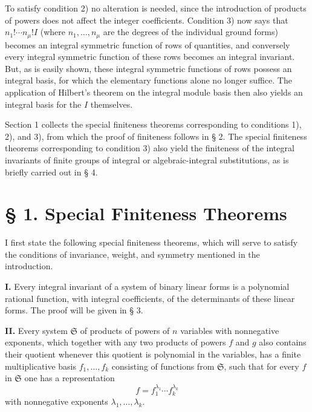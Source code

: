 \documentclass[11pt]{article}
\providecommand{\frS}{\mathfrak S}
\begin{document}
To satisfy condition 2) no alteration is needed, since the introduction of products of powers does not affect the integer coefficients. Condition 3) now says that \(n_1!\cdots n_\mu! I\) (where \(n_1,\ldots,n_\mu\) are the degrees of the individual ground forms) becomes an integral symmetric function of rows of quantities, and conversely every integral symmetric function of these rows becomes an integral invariant. But, as is easily shown, these integral symmetric functions of rows possess an integral basis, for which the elementary functions alone no longer suffice. The application of Hilbert's theorem on the integral module basis then also yields an integral basis for the \(I\) themselves.

Section 1 collects the special finiteness theorems corresponding to conditions 1), 2), and 3), from which the proof of finiteness follows in § 2. The special finiteness theorems corresponding to condition 3) also yield the finiteness of the integral invariants of finite groups of integral or algebraic-integral substitutions, as is briefly carried out in § 4.

\section*{§ 1. Special Finiteness Theorems}

I first state the following special finiteness theorems, which will serve to satisfy the conditions of invariance, weight, and symmetry mentioned in the introduction.

\textbf{I.} Every integral invariant of a system of binary linear forms is a polynomial rational function, with integral coefficients, of the determinants of these linear forms. The proof will be given in § 3.

\textbf{II.} Every system \(\frS\) of products of powers of \(n\) variables with nonnegative exponents, which together with any two products of powers \(f\) and \(g\) also contains their quotient whenever this quotient is polynomial in the variables, has a finite multiplicative basis \(f_1,\ldots,f_k\) consisting of functions from \(\frS\), such that for every \(f\) in \(\frS\) one has a representation
\[
        f=f_1^{\lambda_1}\cdots f_k^{\lambda_k}
\]
with nonnegative exponents \(\lambda_1,\ldots,\lambda_k\).
\end{document}
